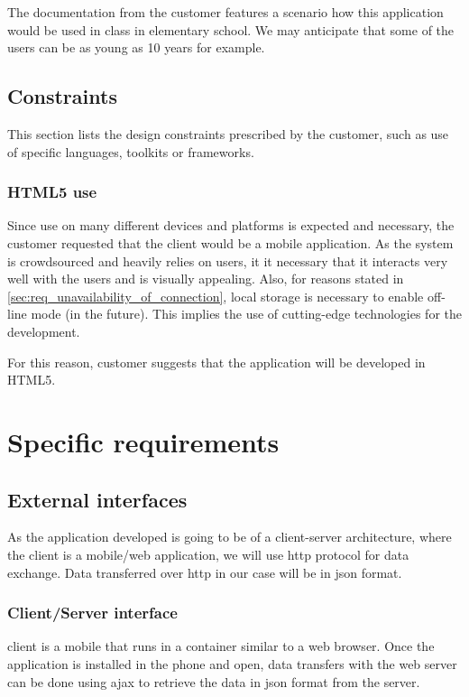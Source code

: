 \documentclass[11pt]{book}
\begin{document}
The documentation from the customer features a scenario how this application would be used in class in elementary school. We may anticipate that some of the users can be as young as 10 years for example.

\subsection{Constraints}

This section lists the design constraints prescribed by the customer, such as use of specific languages, toolkits or frameworks.

\subsubsection{HTML5 use}
Since use on many different devices and platforms is expected and necessary, the customer requested that the client would be a mobile application. As the system is crowdsourced and heavily relies on users, it it necessary that it interacts very well with the users and is visually appealing. Also, for reasons stated in \ref{sec:req_unavailability_of_connection}, local storage is necessary to enable off-line mode (in the future). This implies the use of cutting-edge technologies for the development.

For this reason, customer suggests that the application will be developed in HTML5.

\section{Specific requirements}\label{sec:req_specific_requirements}

\subsection{External interfaces}
As the application developed is going to be of a client-server architecture, where the client is a mobile/web application, we will use \gls{http} protocol for data exchange. Data transferred over \gls{http} in our case will be in \gls{json} format.

\subsubsection{\systemname Client/Server interface}
\systemname client is a mobile that runs in a container similar to a web browser. Once the application is installed in the phone and open, data transfers with the web server can be done using \gls{ajax} to retrieve the data in \gls{json} format from the server.
\end{document}
